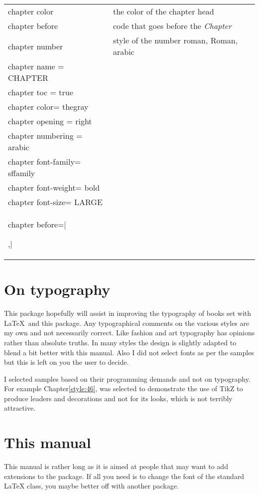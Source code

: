 \begin{longtable}{ll}
chapter color & the color of the chapter head\\
chapter before & code that goes before the \textit{Chapter}\\
chapter number&style of the number roman, Roman, arabic\\
 chapter name = CHAPTER &\\
 chapter toc = true &\\
 chapter color= thegray &\\
 chapter opening = right &\\
 chapter numbering = arabic &\\
 chapter font-family= sffamily &\\
 chapter font-weight= bold &\\
 chapter font-size= LARGE &\\
 chapter before=|{\thinrule\vspace*{20pt}\par\hfill\hfill},|&\\
\end{longtable}



\section{On typography}

This package hopefully will assist in improving the typography of books set with \LaTeX\ and this package. Any typographical comments on the various styles are my own and not necessarily correct. Like fashion and art typography has opinions rather than absolute truths. In many styles the design is slightly adapted to blend a bit better with this manual. Also I did not select fonts as per the samples but this is left on you the user to decide.

I selected samples based on their programming demands and not on  typography. For example Chapter\ref{style:46}, was selected to demonstrate the use of TikZ to produce leaders and decorations and not for its looks, which is not terribly attractive.

\section{This manual}

This manual is rather long as it is aimed at people that may want to add extensions to the package. If all you need is to change the font of the standard LaTeX class, you maybe better off with another package. 

